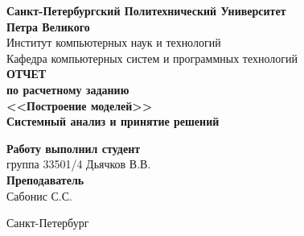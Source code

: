 \begin{titlepage}
\begin{center}
	\textbf{Санкт-Петербургский Политехнический Университет \\Петра Великого}\\[0.3cm]
	\small Институт компьютерных наук и технологий \\[0.3cm]
	\small Кафедра компьютерных систем и программных технологий\\[4cm]
	
	\textbf{ОТЧЕТ}\\ \textbf{по расчетному заданию}\\[0.5cm]
	\textbf{<<Построение моделей>>}\\[0.1cm]
	\textbf{Системный анализ и принятие решений}\\[8.0cm]
\end{center}

\begin{flushright}
	\begin{minipage}{0.4\textwidth}
		\begin{flushleft}
			\small \textbf{Работу выполнил студент}\\[3mm]
			\small группа 33501/4 \hspace*{6mm} Дьячков В.В.\\[5mm]
			
			\small \textbf{Преподаватель}\\[5mm]
		 	\small \sign[3cm] \hspace*{5mm} Сабонис С.С.\\[0.5cm]
		\end{flushleft}
	\end{minipage}
\end{flushright}

\vfill

\begin{center}
	\small Санкт-Петербург\\
	\small \the\year
\end{center}
\end{titlepage}

\addtocounter{page}{1}
